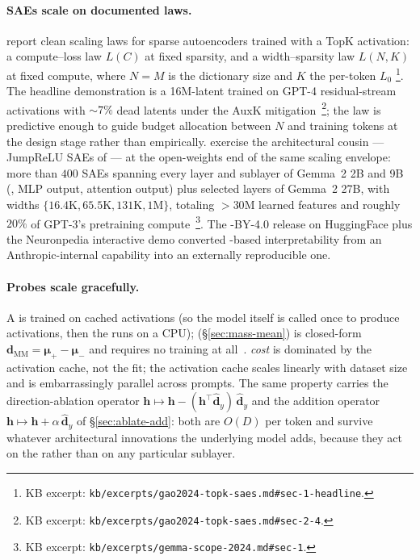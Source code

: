 \paragraph{SAEs scale on documented laws.}
\citet{gao2024-topk-saes} report clean scaling laws for sparse
autoencoders trained with a TopK activation: a compute--loss law
$L(C)$ at fixed sparsity, and a width--sparsity law $L(N, K)$ at fixed
compute, where $N = M$ is the dictionary size and $K$ the per-token
$L_0$ \citep[\S 1, \S 3]{gao2024-topk-saes}\footnote{KB excerpt:
\nolinkurl{kb/excerpts/gao2024-topk-saes.md#sec-1-headline}.}. The headline
demonstration is a 16M-latent  trained on GPT-4 residual-stream
activations with $\sim 7\%$ dead latents under the AuxK
mitigation~\citep[\S 2.4]{gao2024-topk-saes}\footnote{KB excerpt:
\nolinkurl{kb/excerpts/gao2024-topk-saes.md#sec-2-4}.}; the law is
predictive enough to guide budget allocation between $N$ and training
tokens at the design stage rather than empirically. \citet{gemma-scope-2024}
exercise the architectural cousin --- JumpReLU SAEs of
\citet{rajamanoharan2024-jumprelu} --- at the open-weights end of the
same scaling envelope: more than $400$ SAEs spanning every layer and
sublayer of Gemma~2 2B and 9B (, MLP output, attention
output) plus selected layers of Gemma~2 27B, with widths
$\{16.4\text{K}, 65.5\text{K}, 131\text{K}, 1\text{M}\}$, totaling
$>\!30$M learned features and roughly $20\%$ of GPT-3's pretraining
compute~\citep[\S 1]{gemma-scope-2024}\footnote{KB excerpt:
\nolinkurl{kb/excerpts/gemma-scope-2024.md#sec-1}.}. The -BY-4.0 release
on HuggingFace plus the Neuronpedia interactive demo
 converted -based interpretability from an
Anthropic-internal capability into an externally reproducible one.

\paragraph{Probes scale gracefully.}
A  is trained on cached activations (so the model itself is
called once to produce activations, then the  runs on a CPU);
 (\S\ref{sec:mass-mean}) is closed-form
$\mathbf{d}_{\mathrm{MM}} = \boldsymbol{\mu}_+ - \boldsymbol{\mu}_-$ and
requires no training at all~\citep{marks-tegmark-2023-truth}. 
\emph{cost} is dominated by the activation cache, not the  fit;
the activation cache scales linearly with dataset size and is
embarrassingly parallel across prompts. The same property carries the
direction-ablation operator
$\mathbf{h} \mapsto \mathbf{h} - (\mathbf{h}^\top \hat{\mathbf{d}}_y)\,\hat{\mathbf{d}}_y$
and the addition operator $\mathbf{h} \mapsto \mathbf{h} + \alpha\,
\hat{\mathbf{d}}_y$ of \S\ref{sec:ablate-add}: both are $O(D)$ per token
and survive whatever architectural innovations the underlying model
adds, because they act on the  rather than on any
particular sublayer.

